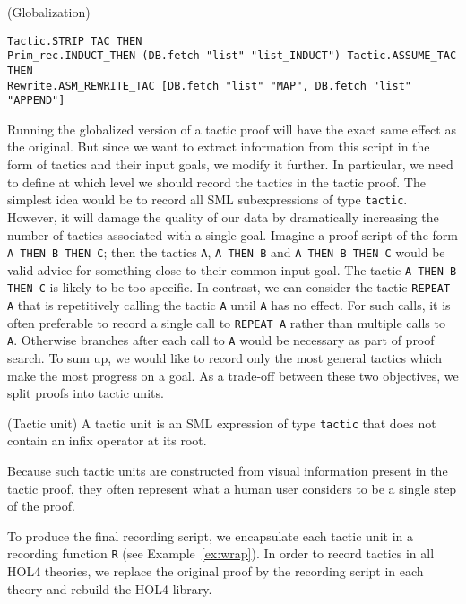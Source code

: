 \documentclass[runningheads,a4paper,draft]{svjour3}
\def\holfour{\textsf{HOL4}\xspace}
\def\sml{\textsf{SML}\xspace}
\begin{document}
\begin{example}\label{ex:r1} (Globalization)
\begin{lstlisting}[language=SMLSmall]
Tactic.STRIP_TAC THEN
Prim_rec.INDUCT_THEN (DB.fetch "list" "list_INDUCT") Tactic.ASSUME_TAC THEN
Rewrite.ASM_REWRITE_TAC [DB.fetch "list" "MAP", DB.fetch "list" "APPEND"]
\end{lstlisting}
\end{example}

Running the globalized version of a tactic proof will have the exact same
effect as the original. But since we want to extract information from this
script in the form of tactics and their input goals, we modify it further.
In particular, we need to define at which level we should record the tactics in
the tactic proof. The simplest idea would be to record all \sml subexpressions
of type \texttt{tactic}. However, it will damage the quality of our data by
dramatically increasing the number of tactics associated with a single goal.
Imagine a proof script of the form \texttt{A THEN B THEN C}; then the tactics
\texttt{A}, \texttt{A THEN B} and \texttt{A THEN B THEN C} would be valid
advice for something close to their common input goal. The tactic
\texttt{A THEN B THEN C} is likely to be too specific. In contrast, we can consider
the tactic \texttt{REPEAT A} that is repetitively calling the tactic \texttt{A}
until
\texttt{A} has no effect. For such calls, it is often preferable to record
a single call to \texttt{REPEAT A} rather than multiple calls to \texttt{A}.
Otherwise branches after each call to \texttt{A} would be necessary as part
of proof search.
To sum up, we would like to record only the most general tactics which
make the most progress on a goal. As a trade-off between these two objectives,
we split proofs into tactic units.

\begin{definition}(Tactic unit)
A tactic unit is an \sml expression of type \texttt{tactic} that does not contain an
infix operator at its root.
\end{definition}

Because such tactic units are constructed from visual information present in
the tactic proof, they often represent what a human user considers to be a single step of
the proof.

To produce the final recording script, we encapsulate each tactic unit
in a recording function \texttt{R} (see Example~\ref{ex:wrap}). In order to
record
tactics in all \holfour theories, we replace the original proof by the
recording script in each theory and rebuild the \holfour library.
\end{document}
